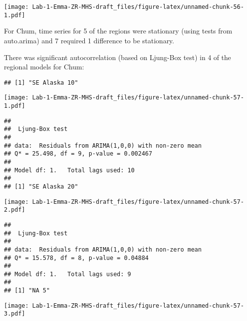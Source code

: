 \documentclass[
]{article}
\newenvironment{Shaded}{\begin{snugshade}}{\end{snugshade}}
\newcommand{\CommentTok}[1]{\textcolor[rgb]{0.56,0.35,0.01}{\textit{#1}}}
\newcommand{\ControlFlowTok}[1]{\textcolor[rgb]{0.13,0.29,0.53}{\textbf{#1}}}
\newcommand{\DecValTok}[1]{\textcolor[rgb]{0.00,0.00,0.81}{#1}}
\newcommand{\FunctionTok}[1]{\textcolor[rgb]{0.00,0.00,0.00}{#1}}
\newcommand{\NormalTok}[1]{#1}
\newcommand{\OtherTok}[1]{\textcolor[rgb]{0.56,0.35,0.01}{#1}}
\newcommand{\SpecialCharTok}[1]{\textcolor[rgb]{0.00,0.00,0.00}{#1}}
\begin{document}
\texttt{[image: Lab-1-Emma-ZR-MHS-draft\_files/figure-latex/unnamed-chunk-56-1.pdf]}

For Chum, time series for 5 of the regions were stationary (using tests
from auto.arima) and 7 required 1 difference to be stationary.

There was significant autocorrelation (based on Ljung-Box test) in 4 of
the regional models for Chum:

\begin{Shaded}
\end{Shaded}

\begin{verbatim}
## [1] "SE Alaska 10"
\end{verbatim}

\texttt{[image: Lab-1-Emma-ZR-MHS-draft\_files/figure-latex/unnamed-chunk-57-1.pdf]}

\begin{verbatim}
## 
##  Ljung-Box test
## 
## data:  Residuals from ARIMA(1,0,0) with non-zero mean
## Q* = 25.498, df = 9, p-value = 0.002467
## 
## Model df: 1.   Total lags used: 10
## 
## [1] "SE Alaska 20"
\end{verbatim}

\texttt{[image: Lab-1-Emma-ZR-MHS-draft\_files/figure-latex/unnamed-chunk-57-2.pdf]}

\begin{verbatim}
## 
##  Ljung-Box test
## 
## data:  Residuals from ARIMA(1,0,0) with non-zero mean
## Q* = 15.578, df = 8, p-value = 0.04884
## 
## Model df: 1.   Total lags used: 9
## 
## [1] "NA 5"
\end{verbatim}

\texttt{[image: Lab-1-Emma-ZR-MHS-draft\_files/figure-latex/unnamed-chunk-57-3.pdf]}
\end{document}
